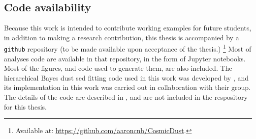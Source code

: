   \subsection{Code availability}
    Because this work is intended to contribute working examples for future students, in addition to making a research contribution, this thesis is accompanied by a {\tt github} repository (to be made available upon acceptance of the thesis.) \footnote{Available at: \url{https://github.com/aaroncnb/CosmicDust}.} Most of analyses code are available in that repository, in the form of Jupyter notebooks. Most of the figures, and code used to generate them, are also included. The hierarchical Bayes dust \acrshort{sed} fitting code used in this work was developed by \cite{galliano18}, and its implementation in this work was carried out in collaboration with their group. The details of the code are described in \cite{galliano18}, and are not included in the respository for this thesis.
